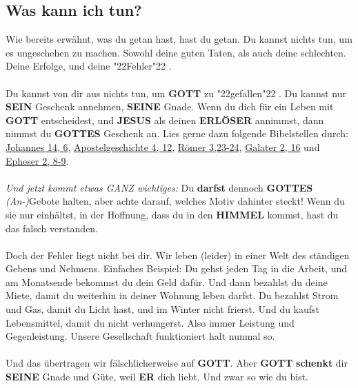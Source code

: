 \documentclass[12pt,a5paper]{article}
\newcommand{\Erloeser}[0]{\textbf{ERL\"OSER}}
\newcommand{\Er}[0]{\textbf{ER}}
\newcommand{\Gottes}[0]{\textbf{GOTTES}}
\newcommand{\Gott}[0]{\textbf{GOTT}}
\newcommand{\Himmel}[0]{\textbf{HIMMEL}}
\newcommand{\Jesus}[0]{\textbf{JESUS}}
\newcommand{\Seine}[0]{\textbf{SEINE}}
\newcommand{\Sein}[0]{\textbf{SEIN}}
\newcommand{\q}[1]{\char"22{#1}\char"22 }
\begin{document}
	\subsection{Was kann ich tun?}
		Wie bereits erw\"ahnt,
		was du getan hast,
		hast du getan.
		Du kannst nichts tun,
		um es ungeschehen zu machen.
		Sowohl deine guten Taten,
		als auch deine schlechten.
		Deine Erfolge,
		und deine \q{Fehler}.
		\\
		\\
		Du kannst von dir aus nichts tun,
		um {\Gott} zu \q{gefallen}.
		Du kannst nur {\Sein} Geschenk annehmen,
		{\Seine} Gnade.
		Wenn du dich f\"ur ein Leben mit {\Gott} entscheidest,
		und {\Jesus} als deinen {\Erloeser} annimmst,
		dann nimmst du {\Gottes} Geschenk an.
		Lies gerne dazu folgende Bibelstellen durch:
		\href{https://www.die-bibel.de/bibeln/online-bibeln/lesen/LU17/JHN.14/Johannes-14}{Johannes 14, 6},
		\href{https://www.die-bibel.de/bibeln/online-bibeln/lesen/LU17/ACT.4/Apostelgeschichte-4}{Apostelgeschichte 4, 12},
		\href{https://www.die-bibel.de/bibeln/online-bibeln/lesen/LU17/ROM.3/Römer-3}{R\"omer 3,23-24},
		\href{https://www.die-bibel.de/bibeln/online-bibeln/lesen/LU17/GAL.2/Galater-2}{Galater 2, 16} und \href{https://www.die-bibel.de/bibeln/online-bibeln/lesen/LU17/EPH.2/Epheser-2}{Epheser 2, 8-9}.
		\\
		\\
		\textit{Und jetzt kommt etwas GANZ wichtiges:}
		Du \textbf{darfst} dennoch {\Gottes} \textit{(An-)}Gebote halten,
		aber achte darauf,
		welches Motiv dahinter steckt!
		Wenn du sie nur einh\"altst,
		in der Hoffnung,
		dass du in den {\Himmel} kommst,
		hast du das falsch verstanden.
		\\
		\\
		Doch der Fehler liegt nicht bei dir.
		Wir leben (leider) in einer Welt des st\"andigen Gebens und Nehmens.
		Einfaches Beispiel:
		Du gehst jeden Tag in die Arbeit,
		und am Monatsende bekommst du dein Geld daf\"ur.
		Und dann bezahlst du deine Miete,
		damit du weiterhin in deiner Wohnung leben darfst.
		Du bezahlst Strom und Gas,
		damit du Licht hast,
		und im Winter nicht frierst.
		Und du kaufst Lebensmittel,
		damit du nicht verhungerst.
		Also immer Leistung und Gegenleistung.
		Unsere Gesellschaft funktioniert halt nunmal so.
		\\
		\\
		Und das \"ubertragen wir f\"alschlicherweise auf {\Gott}.
		Aber {\Gott} \textbf{schenkt} dir {\Seine} Gnade und G\"ute,
		weil {\Er} dich liebt.
		Und zwar so wie du bist.
\end{document}
